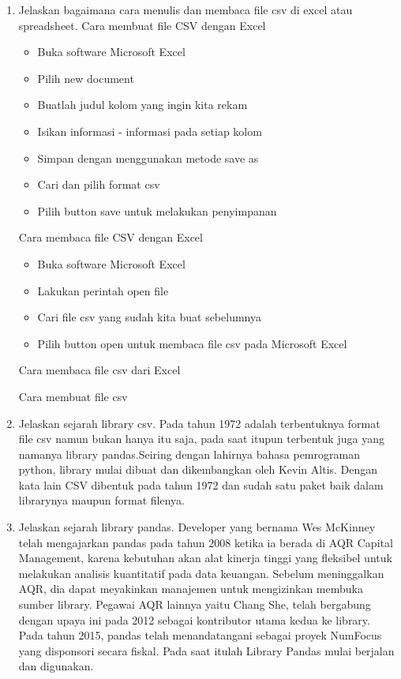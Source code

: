 \begin{enumerate}
\item Jelaskan bagaimana cara menulis dan membaca file csv di excel atau spreadsheet.
	\subitem Cara membuat file CSV dengan Excel
			\begin{itemize}
				\item Buka software Microsoft Excel
				\item Pilih new document
				\item Buatlah judul kolom yang ingin kita rekam
				\item Isikan informasi - informasi pada setiap kolom
				\item Simpan dengan menggunakan metode save as
				\item Cari dan pilih format csv
				\item Pilih button save untuk melakukan penyimpanan
			\end{itemize}
	\subitem Cara membaca file CSV dengan Excel
			\begin{itemize}
				\item Buka software Microsoft Excel
				\item Lakukan perintah open file
				\item Cari file csv yang sudah kita buat sebelumnya
				\item Pilih button open untuk membaca file csv pada Microsoft Excel
			\end{itemize}
	\subitem Cara membaca file csv dari Excel
		
	\subitem Cara membuat file csv
		

\item Jelaskan sejarah library csv. 
	\subitem Pada tahun 1972 adalah terbentuknya format file csv namun bukan hanya itu saja, pada saat itupun terbentuk juga yang namanya library pandas.Seiring dengan lahirnya bahasa pemrograman python, library mulai dibuat dan dikembangkan oleh Kevin Altis. Dengan kata lain CSV dibentuk pada tahun 1972 dan sudah satu paket baik dalam librarynya maupun format filenya. 

\item Jelaskan sejarah library pandas.
	\subitem Developer yang bernama Wes McKinney telah mengajarkan pandas pada tahun 2008 ketika ia berada di AQR Capital Management, karena kebutuhan akan alat kinerja tinggi yang fleksibel untuk melakukan analisis kuantitatif pada data keuangan. Sebelum meninggalkan AQR, dia dapat meyakinkan manajemen untuk mengizinkan membuka sumber library. Pegawai AQR lainnya yaitu Chang She, telah bergabung dengan upaya ini pada 2012 sebagai kontributor utama kedua ke library. Pada tahun 2015, pandas telah menandatangani sebagai proyek NumFocus yang disponsori secara fiskal. Pada saat itulah Library Pandas mulai berjalan dan digunakan.


\end{enumerate}
